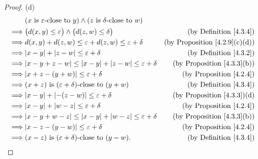 \begin{proof}{(d)}
    \begin{align*}
                 & (x \text{ is \(\varepsilon\)-close to } y) \land (z \text{ is \(\delta\)-close to } w)                                             \\
        \implies & \big(d(x, y) \leq \varepsilon\big) \land \big(d(z, w) \leq \delta\big)                 & \text{(by Definition \ref{4.3.4})}        \\
        \implies & d(x, y) + d(z, w) \leq \varepsilon + d(z, w) \leq \varepsilon + \delta                 & \text{(by Proposition \ref{4.2.9}(c)(d))} \\
        \implies & \abs*{x - y} + \abs*{z - w} \leq \varepsilon + \delta                                  & \text{(by Definition \ref{4.3.2})}        \\
        \implies & \abs*{x - y + z - w} \leq \abs*{x - y} + \abs*{z - w} \leq \varepsilon + \delta        & \text{(by Proposition \ref{4.3.3}(b))}    \\
        \implies & \abs*{x + z - (y + w)} \leq \varepsilon + \delta                                       & \text{(by Proposition \ref{4.2.4})}       \\
        \implies & (x + z) \text{ is \((\varepsilon + \delta)\)-close to } (y + w)                        & \text{(by Definition \ref{4.3.4})}        \\
        \implies & \abs*{x - y} + \abs*{-(z - w)} \leq \varepsilon + \delta                               & \text{(by Proposition \ref{4.3.3})(d)}    \\
        \implies & \abs*{x - y} + \abs*{w - z} \leq \varepsilon + \delta                                  & \text{(by Proposition \ref{4.2.4})}       \\
        \implies & \abs*{x - y + w - z} \leq \abs*{x - y} + \abs*{w - z} \leq \varepsilon + \delta        & \text{(by Proposition \ref{4.3.3}(b))}    \\
        \implies & \abs*{x - z - (y - w)} \leq \varepsilon + \delta                                       & \text{(by Proposition \ref{4.2.4})}       \\
        \implies & (x - z) \text{ is \((\varepsilon + \delta)\)-close to } (y - w).                       & \text{(by Definition \ref{4.3.4})}
    \end{align*}
\end{proof}

